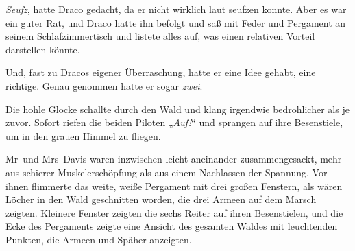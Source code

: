 \emph{Seufz}, hatte Draco gedacht, da er nicht wirklich laut seufzen konnte. Aber es war ein guter Rat, und Draco hatte ihn befolgt und saß mit Feder und Pergament an seinem Schlafzimmertisch und listete alles auf, was einen relativen Vorteil darstellen könnte.

Und, fast zu Dracos eigener Überraschung, hatte er eine Idee gehabt, eine richtige. Genau genommen hatte er sogar \emph{zwei}.

Die hohle Glocke schallte durch den Wald und klang irgendwie bedrohlicher als je zuvor. Sofort riefen die beiden Piloten „\emph{Auf!}“ und sprangen auf ihre Besenstiele, um in den grauen Himmel zu fliegen.

\later

Mr~und Mrs~Davis waren inzwischen leicht aneinander zusammengesackt, mehr aus schierer Muskelerschöpfung als aus einem Nachlassen der Spannung. Vor ihnen flimmerte das weite, weiße Pergament mit drei großen Fenstern, als wären Löcher in den Wald geschnitten worden, die drei Armeen auf dem Marsch zeigten. Kleinere Fenster zeigten die sechs Reiter auf ihren Besenstielen, und die Ecke des Pergaments zeigte eine Ansicht des gesamten Waldes mit leuchtenden Punkten, die Armeen und Späher anzeigten.

